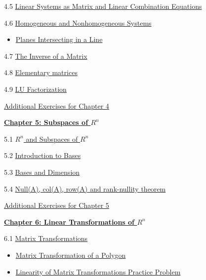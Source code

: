 \documentclass{ximera}
\begin{document}
4.5	\href{https://ximera.osu.edu/oerlinalg/LinearAlgebra/MAT-0030/main}{Linear Systems as Matrix and Linear Combination Equations}
	
4.6	\href{https://ximera.osu.edu/oerlinalg/LinearAlgebra/SYS-0050/main}{Homogeneous and Nonhomogeneous Systems}
\begin{itemize}
    \item 
    \href{https://www.geogebra.org/m/gxjnusja}{Planes Intersecting in a Line}
\end{itemize}

4.7	\href{https://ximera.osu.edu/oerlinalg/LinearAlgebra/MAT-0050/main}{The Inverse of a Matrix}
	
4.8	\href{https://ximera.osu.edu/oerlinalg/LinearAlgebra/MAT-0060/main}{Elementary matrices}
	
4.9	\href{https://ximera.osu.edu/oerlinalg/LinearAlgebra/MAT-0070/main}{LU Factorization}
	
\href{https://ximera.osu.edu/oerlinalg/LinearAlgebra/SUPX-0040/main}{Additional Exercises for Chapter 4}
	
\href{https://ximera.osu.edu/oerlinalg/LinearAlgebra/XLAChapter_subspacesRn/main}{\textbf{Chapter 5: Subspaces of $R^n$}}
	
5.1	\href{https://ximera.osu.edu/oerlinalg/LinearAlgebra/VSP-0020/main}{$R^n$ and Subspaces of $R^n$}
	
5.2	\href{https://ximera.osu.edu/oerlinalg/LinearAlgebra/VSP-0030/main}{Introduction to Bases}
	
5.3	\href{https://ximera.osu.edu/oerlinalg/LinearAlgebra/VSP-0035/main}{Bases and Dimension}
	
5.4	\href{https://ximera.osu.edu/oerlinalg/LinearAlgebra/VSP-0040/main}{Null(A), col(A), row(A) and rank-nullity theorem}
	
\href{https://ximera.osu.edu/oerlinalg/LinearAlgebra/SUPX-0050/main}{Additional Exercises for Chapter 5}
	
\href{https://ximera.osu.edu/oerlinalg/LinearAlgebra/XLAChapter_linTrans/main}{\textbf{Chapter 6: Linear Transformations of $R^n$}}
	
6.1	\href{https://ximera.osu.edu/oerlinalg/LinearAlgebra/LTR-0005/main}{Matrix Transformations}
\begin{itemize}
    \item 
    \href{https://www.geogebra.org/m/cvxdwput}{Matrix Transformation of a Polygon}
    \item
    \href{https://www.geogebra.org/m/nhs3wnqd}{Linearity of Matrix Transformations Practice Problem}
\end{itemize}
	
\end{document}
